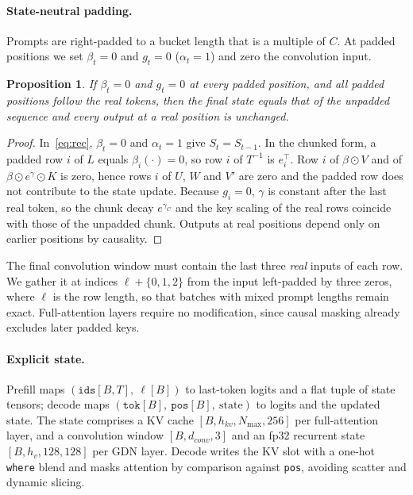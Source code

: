 \documentclass[11pt]{article}
\newtheorem{proposition}{Proposition}
\theoremstyle{remark}
\begin{document}
\paragraph{State-neutral padding.}
Prompts are right-padded to a bucket length that is a multiple of $C$. At padded positions we set $\beta_t=0$ and $g_t=0$
($\alpha_t=1$) and zero the convolution input.
\begin{proposition}\label{prop:padding}
If $\beta_t=0$ and $g_t=0$ at every padded position, and all padded positions follow the real tokens, then the final state
equals that of the unpadded sequence and every output at a real position is unchanged.
\end{proposition}
\begin{proof}
In~\eqref{eq:rec}, $\beta_t=0$ and $\alpha_t=1$ give $S_t=S_{t-1}$. In the chunked form, a padded row $i$ of $L$ equals
$\beta_i(\cdot)=0$, so row $i$ of $T^{-1}$ is $e_i^{\top}$. Row $i$ of $\beta\odot V$ and of $\beta\odot e^\gamma\odot K$ is
zero, hence rows $i$ of $U$, $W$ and $V'$ are zero and the padded row does not contribute to the state update. Because
$g_i=0$, $\gamma$ is constant after the last real token, so the chunk decay $e^{\gamma_C}$ and the key scaling of the real
rows coincide with those of the unpadded chunk. Outputs at real positions depend only on earlier positions by causality.
\end{proof}
The final convolution window must contain the last three \emph{real} inputs of each row. We gather it at indices
$\ell+\{0,1,2\}$ from the input left-padded by three zeros, where $\ell$ is the row length, so that batches with mixed prompt
lengths remain exact. Full-attention layers require no modification, since causal masking already excludes later padded
keys.

\paragraph{Explicit state.} Prefill maps $(\texttt{ids}[B,T],\ \ell[B])$ to last-token logits and a flat tuple of state
tensors; decode maps $(\texttt{tok}[B],\ \texttt{pos}[B],\ \text{state})$ to logits and the updated state. The state comprises
a KV cache $[B,h_{kv},N_{\max},256]$ per full-attention layer, and a convolution window $[B,d_{conv},3]$ and an fp32 recurrent
state $[B,h_v,128,128]$ per GDN layer. Decode writes the KV slot with a one-hot \texttt{where} blend and masks attention by
comparison against \texttt{pos}, avoiding scatter and dynamic slicing.
\end{document}

